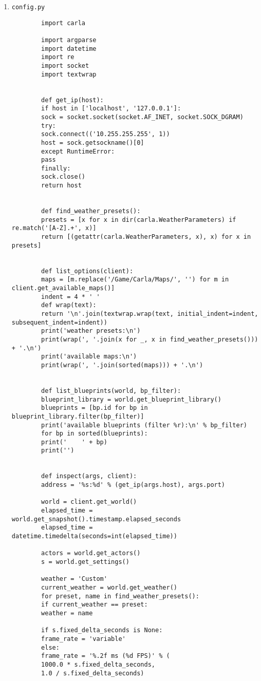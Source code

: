 \begin{enumerate}
	\item \texttt{config.py}
	\begin{verbatim}
		import carla
		
		import argparse
		import datetime
		import re
		import socket
		import textwrap
		
		
		def get_ip(host):
		if host in ['localhost', '127.0.0.1']:
		sock = socket.socket(socket.AF_INET, socket.SOCK_DGRAM)
		try:
		sock.connect(('10.255.255.255', 1))
		host = sock.getsockname()[0]
		except RuntimeError:
		pass
		finally:
		sock.close()
		return host
		
		
		def find_weather_presets():
		presets = [x for x in dir(carla.WeatherParameters) if re.match('[A-Z].+', x)]
		return [(getattr(carla.WeatherParameters, x), x) for x in presets]
		
		
		def list_options(client):
		maps = [m.replace('/Game/Carla/Maps/', '') for m in client.get_available_maps()]
		indent = 4 * ' '
		def wrap(text):
		return '\n'.join(textwrap.wrap(text, initial_indent=indent, subsequent_indent=indent))
		print('weather presets:\n')
		print(wrap(', '.join(x for _, x in find_weather_presets())) + '.\n')
		print('available maps:\n')
		print(wrap(', '.join(sorted(maps))) + '.\n')
		
		
		def list_blueprints(world, bp_filter):
		blueprint_library = world.get_blueprint_library()
		blueprints = [bp.id for bp in blueprint_library.filter(bp_filter)]
		print('available blueprints (filter %r):\n' % bp_filter)
		for bp in sorted(blueprints):
		print('    ' + bp)
		print('')
		
		
		def inspect(args, client):
		address = '%s:%d' % (get_ip(args.host), args.port)
		
		world = client.get_world()
		elapsed_time = world.get_snapshot().timestamp.elapsed_seconds
		elapsed_time = datetime.timedelta(seconds=int(elapsed_time))
		
		actors = world.get_actors()
		s = world.get_settings()
		
		weather = 'Custom'
		current_weather = world.get_weather()
		for preset, name in find_weather_presets():
		if current_weather == preset:
		weather = name
		
		if s.fixed_delta_seconds is None:
		frame_rate = 'variable'
		else:
		frame_rate = '%.2f ms (%d FPS)' % (
		1000.0 * s.fixed_delta_seconds,
		1.0 / s.fixed_delta_seconds)
		

\end{verbatim}
\end{enumerate}
